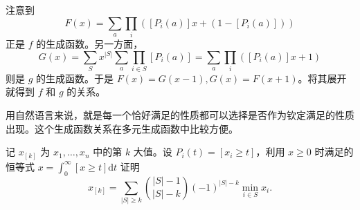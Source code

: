 \begin{example}[二项式反演与生成函数]\label{ex:binomial-inversion and gf}
    注意到
    $$
    F(x)=\sum_a \prod_i ([P_i(a)]x+(1-[P_i(a)]))
    $$
    正是 $f$ 的生成函数。另一方面，
    $$
    G(x)=\sum_S x^{|S|}\sum_a \prod_{i\in S}[P_i(a)]=\sum_a \prod_i ([P_i(a)]x+1)
    $$
    则是 $g$ 的生成函数。于是 $F(x)=G(x-1),G(x)=F(x+1)$。将其展开就得到 $f$ 和 $g$ 的关系。
\end{example}
\begin{remark}
    用自然语言来说，就是每一个恰好满足的性质都可以选择是否作为钦定满足的性质出现。这个生成函数关系在多元生成函数中比较方便。
\end{remark}

\begin{example}
    记 $x_{[k]}$ 为 $x_1,\ldots,x_n$ 中的第 $k$ 大值。设 $P_i(t)=[x_i\ge t]$，利用 $x\ge 0$ 时满足的恒等式 $x=\int_0^\infty [x\ge t] \mathrm{d}t$ 证明
    $$
    x_{[k]}=\sum_{|S|\ge k}\binom{|S|-1}{|S|-k}(-1)^{|S|-k}\min_{i\in S}x_i.
    $$
\end{example}
